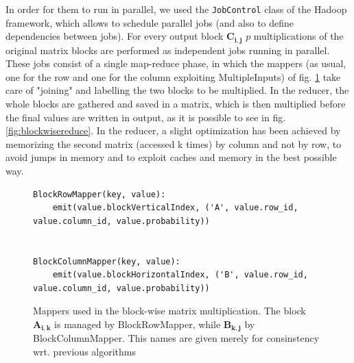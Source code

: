 In order for them to run in parallel, we used the \texttt{JobControl} class of the Hadoop framework, which allows to
schedule parallel jobs (and also to define dependencies between jobs). For every output block $\mathbf{C_{i,j}}$ $p$ 
multiplications of the original matrix blocks are performed as independent jobs running in parallel. 
These jobs consist of a single map-reduce phase, in which the mappers (as usual, one for the row and one for the column exploiting MultipleInputs) of fig. \ref{fig:blockwisemap} take care of "joining" and labelling the two blocks to be multiplied.
In the reducer, the whole blocks are gathered and saved in a matrix, which is then multiplied before the final values
are written in output, as it is possible to see in fig. \ref{fig:blockwisereduce}.
In the reducer, a slight optimization has been achieved by memorizing the second matrix (accessed k times) by column
and not by row, to avoid jumps in memory and to exploit caches and memory in the best possible way.

\begin{figure}
\begin{verbatim}
BlockRowMapper(key, value):
    emit(value.blockVerticalIndex, ('A', value.row_id, value.column_id, value.probability))


BlockColumnMapper(key, value):
    emit(value.blockHorizontalIndex, ('B', value.row_id, value.column_id, value.probability))
\end{verbatim}
\caption{Mappers used in the block-wise matrix multiplication. The block $\mathbf{A_{i,k}}$ is managed by BlockRowMapper, while $\mathbf{B_{k,j}}$ by BlockColumnMapper. This names are given merely for consinstency wrt. previous algorithms} 
\label{fig:blockwisemap}
\end{figure}

